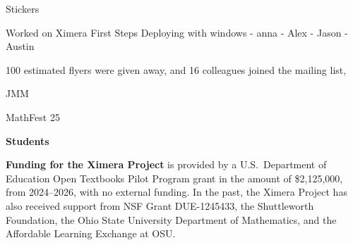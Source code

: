\documentclass{techbrief}
\begin{document}
Stickers

Worked on Ximera First Steps
Deploying with windows
- anna
- Alex
- Jason
- Austin

100 estimated flyers were given away, and
16 colleagues joined the mailing list,

JMM

MathFest 25

\begin{xframe}
    {\sffamily\bfseries Students} \lipsum[1]
\end{xframe}

\lipsum[1-6]

\restoregeometry

\lipsum[1-6]

\begin{xframe}
    \textbf{Funding for the Ximera Project} is provided by
    a U.S.\ Department of Education Open Textbooks Pilot Program grant in the
    amount of \$2,125,000, from 2024--2026, with no external funding. In the
    past, the Ximera Project has
    also received support from NSF Grant DUE-1245433, the Shuttleworth
    Foundation, the Ohio State University
    Department of Mathematics, and the Affordable Learning Exchange at OSU.
\end{xframe}
\end{document}
